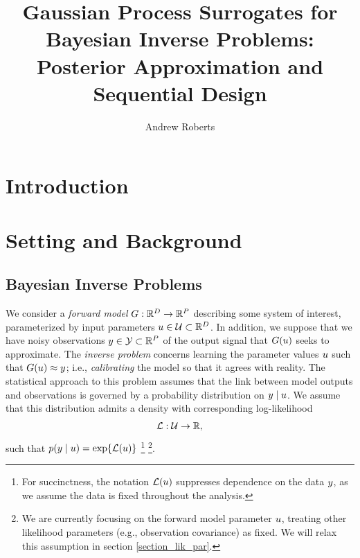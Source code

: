 \documentclass[12pt]{article}
\title{Gaussian Process Surrogates for Bayesian Inverse Problems: Posterior Approximation and Sequential Design}
\author{Andrew Roberts}
\begin{document}
\maketitle


\section{Introduction}

\section{Setting and Background}

\subsection{Bayesian Inverse Problems}
We consider a \textit{forward model} $G: \mathbb{R}^{D} \to \mathbb{R}^{P}$ describing some system of interest, parameterized by 
input parameters $u \in \mathcal{U} \subset \mathbb{R}^{D}$. In addition, we suppose that we have noisy observations 
$y \in \mathcal{Y} \subset \mathbb{R}^{P}$ of the output signal that $G(u)$ seeks to approximate. The 
\textit{inverse problem} concerns learning the parameter values $u$ such that $G(u) \approx y$; i.e., \textit{calibrating}
the model so that it agrees with reality. The statistical approach to this problem assumes that the link between model outputs and 
observations is governed by a probability distribution on  $y \mid u$. We assume that this distribution admits a density 
with corresponding log-likelihood 
\begin{align}
\mathcal{L}: \mathcal{U} \to \mathbb{R}, \label{log_likelihood}
\end{align}
such that $p(y \mid u) = \exp\mathopen{}\left\{\mathcal{L}(u)\right\}\mathclose{}$ 
\footnote{For succinctness, the notation $\mathcal{L}(u)$ suppresses dependence on the data $y$, 
as we assume the data is fixed throughout the analysis.}
\footnote{We are currently focusing on the forward model parameter $u$, treating other likelihood 
parameters (e.g., observation covariance) as fixed. We will relax this assumption 
in section \ref{section_lik_par}.}.
\end{document}
